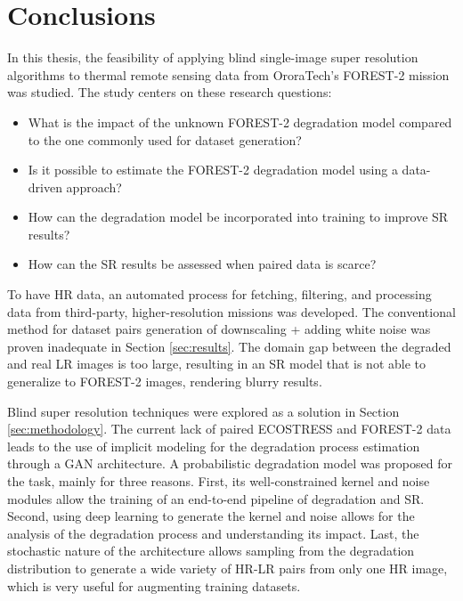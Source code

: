 \section{Conclusions}

In this thesis, the feasibility of applying blind single-image super resolution algorithms to thermal remote sensing data from OroraTech’s FOREST-2 mission was studied. The study centers on these research questions:

\begin{itemize}
    \item What is the impact of the unknown FOREST-2 degradation model compared to the one commonly used for dataset generation?
    \item Is it possible to estimate the FOREST-2 degradation model using a data-driven approach?
    \item How can the degradation model be incorporated into training to improve SR results?
    \item  How can the SR results be assessed when paired data is scarce?
\end{itemize}

To have HR data, an automated process for fetching, filtering, and processing data from third-party, higher-resolution missions was developed. The conventional method for dataset pairs generation of downscaling + adding white noise was proven inadequate in Section \ref{sec:results}. The domain gap between the degraded and real LR images is too large, resulting in an SR model that is not able to generalize to FOREST-2 images, rendering blurry results.

Blind super resolution techniques were explored as a solution in Section \ref{sec:methodology}. The current lack of paired ECOSTRESS and FOREST-2 data leads to the use of implicit modeling for the degradation process estimation through a GAN architecture. A probabilistic degradation model was proposed for the task, mainly for three reasons. First, its well-constrained kernel and noise modules allow the training of an end-to-end pipeline of degradation and SR. Second, using deep learning to generate the kernel and noise allows for the analysis of the degradation process and understanding its impact. Last, the stochastic nature of the architecture allows sampling from the degradation distribution to generate a wide variety of HR-LR pairs from only one HR image, which is very useful for augmenting training datasets.

